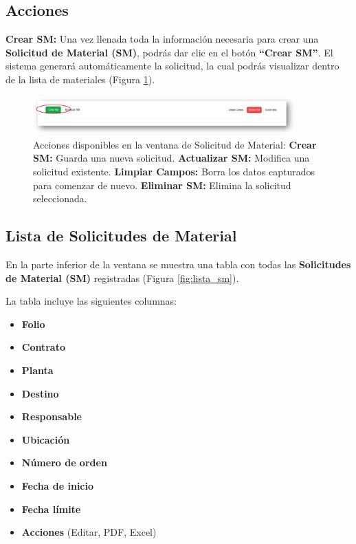 \subsection{Acciones}

\textbf{Crear SM:} Una vez llenada toda la información necesaria para crear una \textbf{Solicitud de Material (SM)}, podrás dar clic en el botón \textbf{“Crear SM”}.  
El sistema generará automáticamente la solicitud, la cual podrás visualizar dentro de la lista de materiales (Figura \ref{fig:acciones_crear_sm}).

\begin{figure}[H]
    \centering
    \includegraphics[width=0.9\textwidth]{imgs/Almacen_General/Solicitudes_de_materia_SM/acciones.png}
    \caption{Acciones disponibles en la ventana de Solicitud de Material: 
    \textbf{Crear SM:} Guarda una nueva solicitud. 
    \textbf{Actualizar SM:} Modifica una solicitud existente. 
    \textbf{Limpiar Campos:} Borra los datos capturados para comenzar de nuevo. 
    \textbf{Eliminar SM:} Elimina la solicitud seleccionada.}
    \label{fig:acciones_crear_sm}
\end{figure}

\subsection{Lista de Solicitudes de Material}

En la parte inferior de la ventana se muestra una tabla con todas las \textbf{Solicitudes de Material (SM)} registradas (Figura \ref{fig:lista_sm}).  

La tabla incluye las siguientes columnas:

\begin{itemize}
    \item \textbf{Folio}
    \item \textbf{Contrato}
    \item \textbf{Planta}
    \item \textbf{Destino}
    \item \textbf{Responsable}
    \item \textbf{Ubicación}
    \item \textbf{Número de orden}
    \item \textbf{Fecha de inicio}
    \item \textbf{Fecha límite}
    \item \textbf{Acciones} (Editar, PDF, Excel)
\end{itemize}

